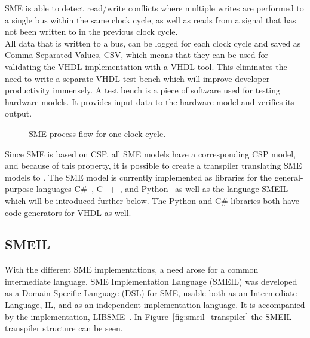 SME is able to detect read/write conflicts where multiple writes are performed to a single bus within the same clock cycle, as well as reads from a signal that has not been written to in the previous clock cycle.\\

All data that is written to a bus, can be logged for each clock cycle and saved as Comma-Separated Values, CSV, which means that they can be used for validating the VHDL implementation with a VHDL tool. This eliminates the need to write a separate VHDL test bench which will improve developer productivity immensely. A test bench is a piece of software used for testing hardware models. It provides input data to the hardware model and verifies its output.\\

\begin{figure}[!ht]
  \centering
  \caption{SME process flow for one clock cycle.}
  \label{fig:sme_process_flow}
\end{figure}
Since SME is based on CSP, all SME models have a
corresponding CSP model, and because of this property, it is possible to create a transpiler translating SME models to \cspm{}.
The SME model is currently implemented as libraries for the general-purpose languages C\#~\cite{Skovhede}, C++~\cite{asheim2015}, and Python~\cite{asheim2016vhdl} as well as the language SMEIL which will be introduced further below. The Python and C\# libraries both have code generators for VHDL as well.
\subsection{SMEIL}
\label{sec:background_smeil}
With the different SME implementations, a need arose for a common intermediate language. SME Implementation Language (SMEIL) was developed as a Domain Specific Language (DSL) for SME, usable both as an Intermediate Language, IL, and as an independent implementation language. It is accompanied by the implementation, LIBSME~\cite{libsme}. In Figure~\ref{fig:smeil_transpiler} the SMEIL transpiler structure can be seen.\\

